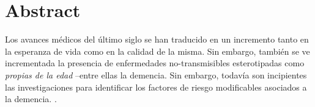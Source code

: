 % 
% 
%


\chapter*{Abstract}

%
%

Los avances m\'edicos del \'ultimo siglo se han traducido en un incremento tanto en la esperanza
de vida como en la calidad de la misma. Sin embargo, tambi\'en se ve incrementada la presencia
de enfermedades no-transmisibles esterotipadas como \textit{propias de la edad} --entre ellas la 
demencia.
Sin embargo, todav\'ia son incipientes las investigaciones para identificar los factores de riesgo 
modificables asociados a la demencia. \cite{PlanAlzheimer04}.

